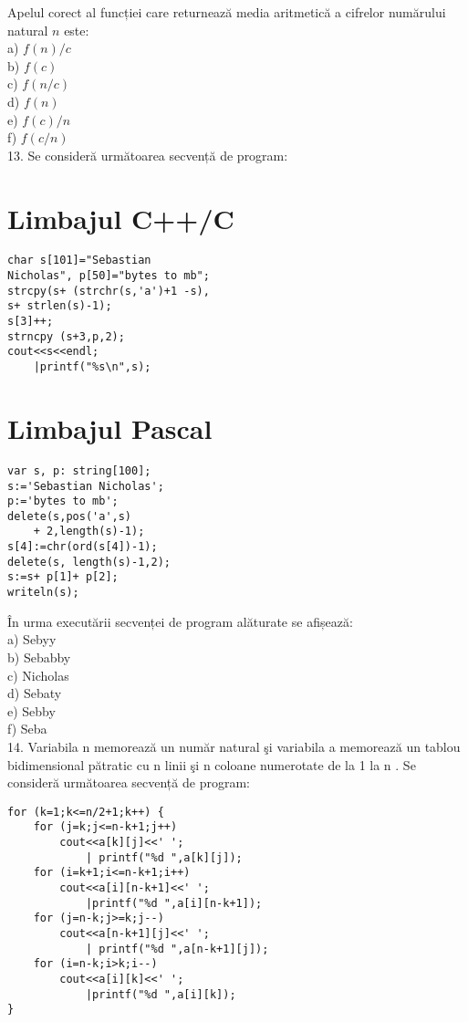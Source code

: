 Apelul corect al funcției care returnează media aritmetică a cifrelor numărului natural $n$ este:\\
a) $f(n) / c$\\
b) $f(c)$\\
c) $f(n / c)$\\
d) $f(n)$\\
e) $f(c) / n$\\
f) $f(c / n)$\\
13. Se consideră următoarea secvență de program:

\section*{Limbajul C++/C}
\begin{verbatim}
char s[101]="Sebastian
Nicholas", p[50]="bytes to mb";
strcpy(s+ (strchr(s,'a')+1 -s),
s+ strlen(s)-1);
s[3]++;
strncpy (s+3,p,2);
cout<<s<<endl;
    |printf("%s\n",s);
\end{verbatim}

\section*{Limbajul Pascal}
\begin{verbatim}
var s, p: string[100];
s:='Sebastian Nicholas';
p:='bytes to mb';
delete(s,pos('a',s)
    + 2,length(s)-1);
s[4]:=chr(ord(s[4])-1);
delete(s, length(s)-1,2);
s:=s+ p[1]+ p[2];
writeln(s);
\end{verbatim}

În urma executării secvenței de program alăturate se afișează:\\
a) Sebyy\\
b) Sebabby\\
c) Nicholas\\
d) Sebaty\\
e) Sebby\\
f) Seba\\
14. Variabila n memorează un număr natural şi variabila a memorează un tablou bidimensional pătratic cu n linii şi n coloane numerotate de la 1 la n . Se consideră următoarea secvență de program:

\begin{verbatim}
for (k=1;k<=n/2+1;k++) {
    for (j=k;j<=n-k+1;j++)
        cout<<a[k][j]<<' ';
            | printf("%d ",a[k][j]);
    for (i=k+1;i<=n-k+1;i++)
        cout<<a[i][n-k+1]<<' ';
            |printf("%d ",a[i][n-k+1]);
    for (j=n-k;j>=k;j--)
        cout<<a[n-k+1][j]<<' ';
            | printf("%d ",a[n-k+1][j]);
    for (i=n-k;i>k;i--)
        cout<<a[i][k]<<' ';
            |printf("%d ",a[i][k]);
}
\end{verbatim}

